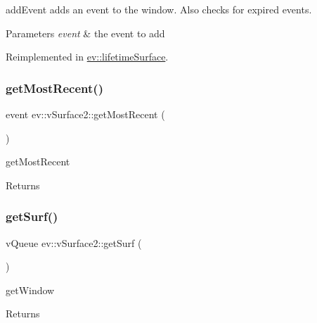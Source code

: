 add\+Event adds an event to the window. Also checks for expired events. 


\begin{DoxyParams}{Parameters}
{\em event} & the event to add \\
\hline
\end{DoxyParams}


Reimplemented in \hyperlink{classev_1_1lifetimeSurface_a8fce037a13281c0e46c7d660e0ea2275}{ev\+::lifetime\+Surface}.

\mbox{\label{classev_1_1vSurface2_af84a860e057aea43831e8e6d16107cd4}} 
\subsubsection{\texorpdfstring{get\+Most\+Recent()}{getMostRecent()}}
{\footnotesize\ttfamily event ev\+::v\+Surface2\+::get\+Most\+Recent (\begin{DoxyParamCaption}{ }\end{DoxyParamCaption})}



get\+Most\+Recent 

\begin{DoxyReturn}{Returns}

\end{DoxyReturn}
\mbox{\label{classev_1_1vSurface2_aedcc28d0ccdbc343f031506a8fa84bb0}} 
\subsubsection{\texorpdfstring{get\+Surf()}{getSurf()}\hspace{0.1cm}{\footnotesize\ttfamily [1/3]}}
{\footnotesize\ttfamily v\+Queue ev\+::v\+Surface2\+::get\+Surf (\begin{DoxyParamCaption}{ }\end{DoxyParamCaption})}



get\+Window 

\begin{DoxyReturn}{Returns}

\end{DoxyReturn}
\mbox{\label{classev_1_1vSurface2_a42f7a69a075225254ffddc7bb5d4d9ba}} 
